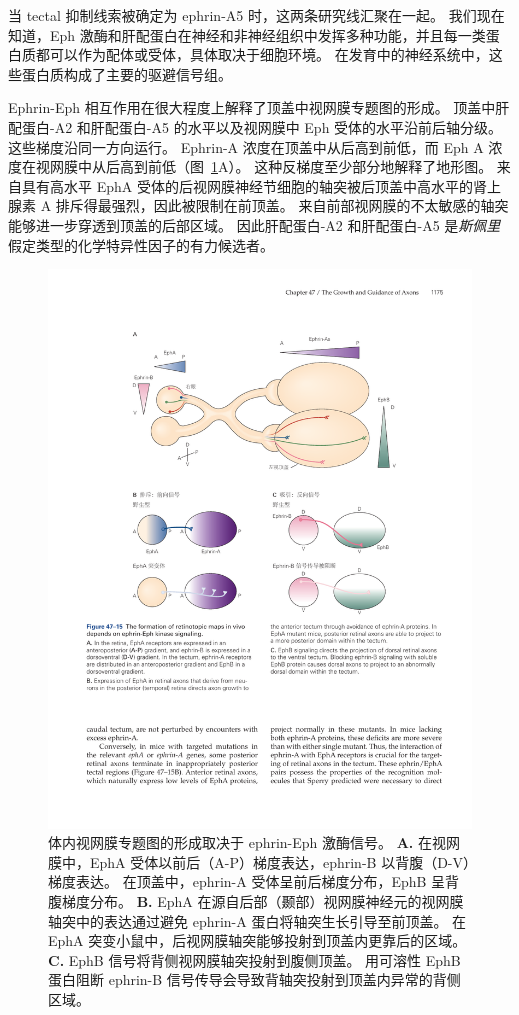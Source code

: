 当 tectal 抑制线索被确定为 ephrin-A5 时，这两条研究线汇聚在一起。
我们现在知道，Eph 激酶和肝配蛋白在神经和非神经组织中发挥多种功能，并且每一类蛋白质都可以作为配体或受体，具体取决于细胞环境。
在发育中的神经系统中，这些蛋白质构成了主要的驱避信号组。


Ephrin-Eph 相互作用在很大程度上解释了顶盖中视网膜专题图的形成。
顶盖中肝配蛋白-A2 和肝配蛋白-A5 的水平以及视网膜中 Eph 受体的水平沿前后轴分级。
这些梯度沿同一方向运行。
Ephrin-A 浓度在顶盖中从后高到前低，而 Eph A 浓度在视网膜中从后高到前低（图~\ref{fig:47_15}A）。
这种反梯度至少部分地解释了地形图。
来自具有高水平 EphA 受体的后视网膜神经节细胞的轴突被后顶盖中高水平的肾上腺素 A 排斥得最强烈，因此被限制在前顶盖。
来自前部视网膜的不太敏感的轴突能够进一步穿透到顶盖的后部区域。
因此肝配蛋白-A2 和肝配蛋白-A5 是\textit{斯佩里}假定类型的化学特异性因子的有力候选者。


\begin{figure}[htbp]
	\centering
	\includegraphics[width=0.8\linewidth]{chap47/fig_47_15}
	\caption{体内视网膜专题图的形成取决于 ephrin-Eph 激酶信号。
		\textbf{A.} 在视网膜中，EphA 受体以前后（A-P）梯度表达，ephrin-B 以背腹（D-V）梯度表达。 
		在顶盖中，ephrin-A 受体呈前后梯度分布，EphB 呈背腹梯度分布。
		\textbf{B.} EphA 在源自后部（颞部）视网膜神经元的视网膜轴突中的表达通过避免 ephrin-A 蛋白将轴突生长引导至前顶盖。
		在 EphA 突变小鼠中，后视网膜轴突能够投射到顶盖内更靠后的区域。
		\textbf{C.} EphB 信号将背侧视网膜轴突投射到腹侧顶盖。
		用可溶性 EphB 蛋白阻断 ephrin-B 信号传导会导致背轴突投射到顶盖内异常的背侧区域。}
	\label{fig:47_15}
\end{figure}


